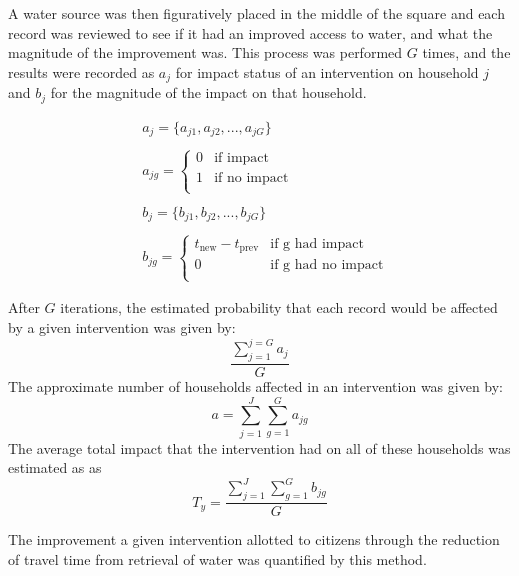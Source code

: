 A water source was then figuratively placed in the middle of the square and each record was reviewed to see if it had an improved access to water, and what the magnitude of the improvement was.
This process was performed $G$ times, and the results were recorded as $a_j$ for impact status of an intervention on household $j$ and $b_j$ for the magnitude of the impact on that household.

\begin{equation*}
\begin{aligned}
& a_j = \{a_{j1},a_{j2},...,a_{jG}\}\\\\
& a_{jg} =
\left\{
\begin{array}{ll}
      0 & \text{if impact}\\
      1 & \text{if no impact} \\
\end{array}
\right.\\\\
& b_j = \{b_{j1},b_{j2},...,b_{jG}\}\\\\
& b_{jg} =
\left\{
\begin{array}{ll}
      t_{\text{new}} - t_{\text{prev}} & \text{if g had impact} \\
      0 & \text{if g had no impact}\\
\end{array}
\right.
\end{aligned}
\end{equation*}

After $G$ iterations, the estimated probability that each record would be affected by a given intervention was given by:
\begin{equation*}
\frac{\sum_{j=1}^{j=G} a_j}{G}
\end{equation*}
The approximate number of households affected in an intervention was given by:
\begin{equation*}
a = \sum_{j=1}^{J} \sum_{g=1}^{G} a_{jg}
\end{equation*}
The average total impact that the intervention had on all of these households was estimated as as
\begin{equation*}
T_y = \frac{\sum_{j=1}^{J} \sum_{g=1}^{G} b_{jg}}{G}
\end{equation*}

The improvement a given intervention allotted to citizens through the reduction of travel time from retrieval of water was quantified by this method.

